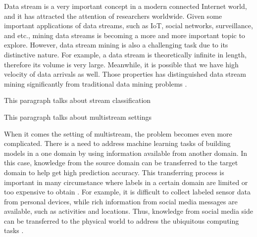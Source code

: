 Data stream is a very important concept in a modern connected Internet 
world, and it has attracted the attention of researchers worldwide. Given some important
applications of data streams, such as IoT, social networks, surveillance, and etc.,
mining data streams is becoming a more and more important topic to explore. 
However, data stream mining is also a challenging task due to its distinctive nature. 
For example, a data stream is theoretically infinite in length, therefore its volume
is very large. Meanwhile, it is possible that we have high velocity of data arrivals as well. Those properties has distinguished data 
stream mining significantly from traditional data mining problems \cite{haque2016SAND}.


This paragraph talks about stream classification

This paragraph talks about multistream settings

When it comes the setting of multistream, the problem
becomes even more complicated. There is a need to address machine learning tasks of building 
models in a one domain by using information available from another domain. In
this case, knowledge from the source domain can be transferred to the target domain to
help get high prediction accuracy. This transferring process is important in many 
circumstance where labels in a certain domain are limited or too expensive to obtain \cite{arnold2007comparative, hoi2014libol}.
For example, it is difficult to collect labeled sensor
data from personal devices, while rich information from social media messages are available, such as 
activities and locations. Thus, knowledge from social media side can be transferred to
the physical world to address the ubiquitous computing tasks \cite{wei2016instilling}. 


